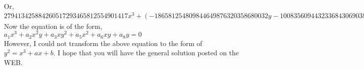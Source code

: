 Or,\\

\noindent
$279413425884260517293465812554901417x^3 + (-186581254809844649876320358680032y - 1008356094432336843069038192483721489312)x^2 + (-621770391848687064170874624y^2 + 111824874149270490545639386203403776y)x - 11943307501840672636548606879107026944y = 0$
\\

Now the equation is of the form,\\
$a_1x^3 + a_2x^2y + a_3xy^2 + a_5x^2 + a_6xy + a_8y = 0$
\\However, I could not transform the above equation to the form of\\
$y^2   = x^3 + ax + b$. I hope that you will have the general solution
posted on the WEB.


